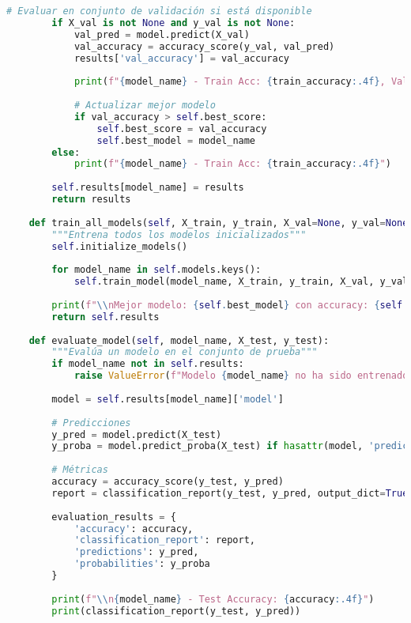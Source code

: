 \begin{lstlisting}[language=Python, caption=Módulo de entrenamiento de modelos]
        # Evaluar en conjunto de validación si está disponible
        if X_val is not None and y_val is not None:
            val_pred = model.predict(X_val)
            val_accuracy = accuracy_score(y_val, val_pred)
            results['val_accuracy'] = val_accuracy
            
            print(f"{model_name} - Train Acc: {train_accuracy:.4f}, Val Acc: {val_accuracy:.4f}")
            
            # Actualizar mejor modelo
            if val_accuracy > self.best_score:
                self.best_score = val_accuracy
                self.best_model = model_name
        else:
            print(f"{model_name} - Train Acc: {train_accuracy:.4f}")
        
        self.results[model_name] = results
        return results
    
    def train_all_models(self, X_train, y_train, X_val=None, y_val=None):
        """Entrena todos los modelos inicializados"""
        self.initialize_models()
        
        for model_name in self.models.keys():
            self.train_model(model_name, X_train, y_train, X_val, y_val)
        
        print(f"\\nMejor modelo: {self.best_model} con accuracy: {self.best_score:.4f}")
        return self.results
    
    def evaluate_model(self, model_name, X_test, y_test):
        """Evalúa un modelo en el conjunto de prueba"""
        if model_name not in self.results:
            raise ValueError(f"Modelo {model_name} no ha sido entrenado")
        
        model = self.results[model_name]['model']
        
        # Predicciones
        y_pred = model.predict(X_test)
        y_proba = model.predict_proba(X_test) if hasattr(model, 'predict_proba') else None
        
        # Métricas
        accuracy = accuracy_score(y_test, y_pred)
        report = classification_report(y_test, y_pred, output_dict=True)
        
        evaluation_results = {
            'accuracy': accuracy,
            'classification_report': report,
            'predictions': y_pred,
            'probabilities': y_proba
        }
        
        print(f"\\n{model_name} - Test Accuracy: {accuracy:.4f}")
        print(classification_report(y_test, y_pred))
        

\end{lstlisting}
